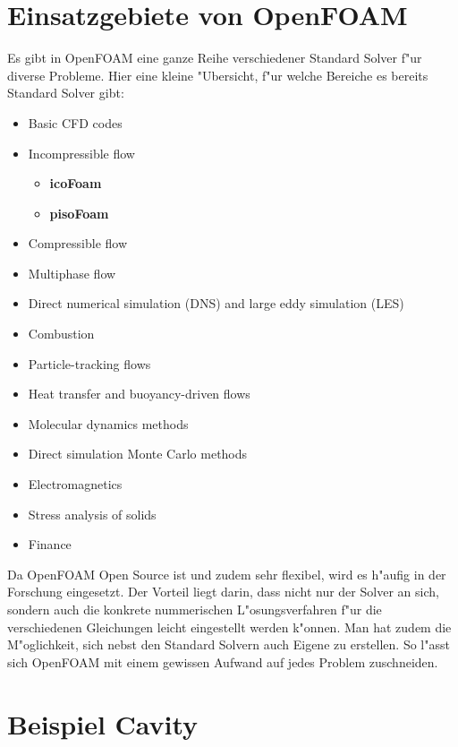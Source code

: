 \begin{refsection}
\section{Einsatzgebiete von OpenFOAM}
Es gibt in OpenFOAM eine ganze Reihe verschiedener Standard Solver f"ur diverse Probleme. Hier eine kleine "Ubersicht, f"ur welche Bereiche es bereits Standard Solver gibt:
\begin{itemize}
\setlength{\itemsep}{2pt}
\setlength{\parsep}{2pt}
\item Basic CFD codes  
\item Incompressible flow 
\begin{itemize}
\item \textbf{icoFoam}
\item \textbf{pisoFoam}
\end{itemize}
\item Compressible flow 
\item Multiphase flow
\item Direct numerical simulation (DNS) and large eddy simulation (LES)
\item Combustion
\item Particle-tracking flows
\item Heat transfer and buoyancy-driven flows
\item Molecular dynamics methods
\item Direct simulation Monte Carlo methods
\item Electromagnetics
\item Stress analysis of solids
\item Finance
\end{itemize} 

Da OpenFOAM Open Source ist und zudem sehr flexibel, wird es h"aufig in
der Forschung eingesetzt. Der Vorteil liegt darin, dass nicht nur der
Solver an sich, sondern auch die konkrete nummerischen L"osungsverfahren
f"ur die verschiedenen Gleichungen leicht eingestellt werden k"onnen. Man
hat zudem die M"oglichkeit, sich nebst den Standard Solvern auch Eigene
zu erstellen. So l"asst sich OpenFOAM mit einem gewissen Aufwand auf
jedes Problem zuschneiden. \cite{of}

\section{Beispiel Cavity}

\end{refsection}

